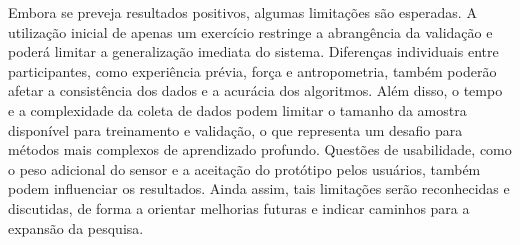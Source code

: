 Embora se preveja resultados positivos, algumas limitações são esperadas. A utilização inicial de apenas um exercício restringe a abrangência da validação e poderá limitar a generalização imediata do sistema. Diferenças individuais entre participantes, como experiência prévia, força e antropometria, também poderão afetar a consistência dos dados e a acurácia dos algoritmos. Além disso, o tempo e a complexidade da coleta de dados podem limitar o tamanho da amostra disponível para treinamento e validação, o que representa um desafio para métodos mais complexos de aprendizado profundo. Questões de usabilidade, como o peso adicional do sensor e a aceitação do protótipo pelos usuários, também podem influenciar os resultados. Ainda assim, tais limitações serão reconhecidas e discutidas, de forma a orientar melhorias futuras e indicar caminhos para a expansão da pesquisa.  


